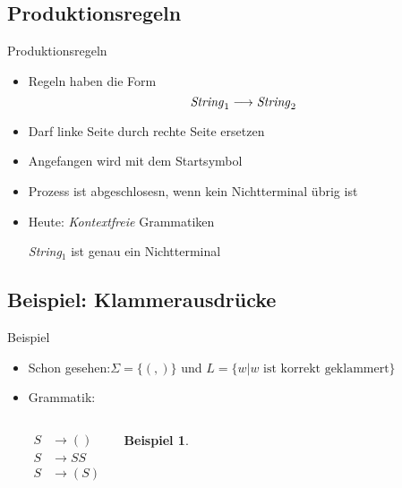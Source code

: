 \documentclass{beamer}
\theoremstyle{example}
\newtheorem{ex}{Beispiel}
\begin{document}
\subsection{Produktionsregeln}
\begin{frame}{Produktionsregeln}
  \begin{itemize}
  \item Regeln haben die Form
    \[\text{\textit{String}}_1 \longrightarrow \text{\textit{String}}_2\]
  \item Darf linke Seite durch rechte Seite ersetzen
  \item Angefangen wird mit dem Startsymbol
  \item Prozess ist abgeschlosesn, wenn kein Nichtterminal übrig ist
  \item Heute: \emph{Kontextfreie} Grammatiken

    \textit{String$_1$} ist genau ein Nichtterminal
  \end{itemize}
\end{frame}

\subsection{Beispiel: Klammerausdrücke}
\begin{frame}{Beispiel}
  \begin{itemize}
  \item Schon gesehen:$\Sigma = \{(,)\}$ und  $L = \{ w | \text{$w$ ist korrekt geklammert}\}$
  \item Grammatik:
    \begin{columns}[l]
     \column{2cm}
    \begin{align*}
      S &\rightarrow ()\\
      S &\rightarrow SS\\
      S &\rightarrow (S)
    \end{align*}
     \column{6cm}
     \begin{ex}
       \vspace*{5cm}
       \hspace*{6cm}
     \end{ex}
    \end{columns}
  \end{itemize}
\end{frame}
\end{document}
